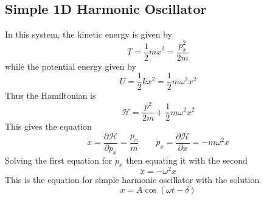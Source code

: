 \documentclass[../../../main.tex]{subfiles}
\begin{document}
\subsection*{Simple 1D Harmonic Oscillator}
In this system, the kinetic energy is given by 
\begin{equation*}
   T=\frac{1}{2}m\dot{x}^2=\frac{p_x^2}{2m}
\end{equation*}
while the potential energy given by 
\begin{equation*}
   U=\frac{1}{2}kx^2=\frac{1}{2}m\omega^2x^2
\end{equation*}
Thus the Hamiltonian is
\begin{equation*}
   \mathcal{H}=\frac{p^2}{2m}+\frac{1}{2}m\omega^2x^2
\end{equation*}
This gives the equation
\begin{equation*}
   \dot{x}=\frac{\partial\mathcal{H}}{\partial p_x}=\frac{p_x}{m}\qquad\dot{p}_x=\frac{\partial\mathcal{H}}{\partial x}=-m\omega^2x
\end{equation*}
Solving the first equation for $\dot{p}_x$ then equating it with the second 
\begin{equation*}
   \ddot{x}=-\omega^2x
\end{equation*}
This is the equation for simple harmonic oscillator with the solution
\begin{equation*}
   x=A\cos(\omega t-\delta)
\end{equation*}
\end{document}

